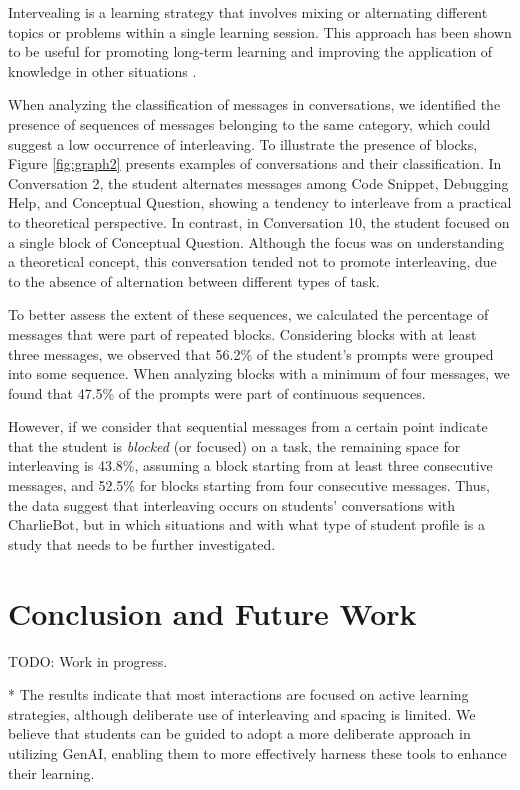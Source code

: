 \documentclass[a4paper,twoside]{article}
\begin{document}
Intervealing is a learning strategy that involves mixing or alternating
different topics or problems within a single learning session. This approach has
been shown to be useful for promoting long-term learning and improving the
application of knowledge in other situations \citep{Rivers21}.

When analyzing the classification of messages in conversations, we identified
the presence of sequences of messages belonging to the same category, which
could suggest a low occurrence of interleaving. To illustrate the presence of
blocks, Figure \ref{fig:graph2} presents examples of conversations and their
classification. In Conversation 2, the student alternates messages among Code
Snippet, Debugging Help, and Conceptual Question, showing a tendency to
interleave from a practical to theoretical perspective. In contrast, in
Conversation 10, the student focused on a single block of Conceptual Question.
Although the focus was on understanding a theoretical concept, this conversation
tended not to promote interleaving, due to the absence of alternation between
different types of task.

To better assess the extent of these sequences, we calculated the percentage of
messages that were part of repeated blocks. Considering blocks with at least
three messages, we observed that 56.2\% of the student's prompts were grouped
into some sequence. When analyzing blocks with a minimum of four messages, we
found that 47.5\% of the prompts were part of continuous sequences.

However, if we consider that sequential messages from a certain point indicate
that the student is \textit{blocked} (or focused) on a task, the remaining space
for interleaving is 43.8\%, assuming a block starting from at least three
consecutive messages, and 52.5\% for blocks starting from four consecutive
messages. Thus, the data suggest that interleaving occurs on students'
conversations with CharlieBot, but in which situations and with what type of
student profile is a study that needs to be further investigated.

\section{Conclusion and Future Work}

TODO: Work in progress.

* The results indicate that most interactions are focused on active learning
strategies, although deliberate use of interleaving and spacing is limited. We
believe that students can be guided to adopt a more deliberate approach in
utilizing GenAI, enabling them to more effectively harness these tools to
enhance their learning.
\end{document}
